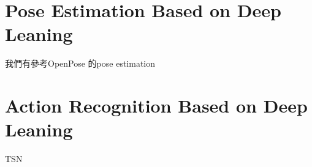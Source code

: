\label{sec:related}

\section{Pose Estimation Based on Deep Leaning}

我們有參考OpenPose \cite{cao2018openpose} 的pose estimation

\section{Action Recognition Based on Deep Leaning}

TSN

\EndChapter
